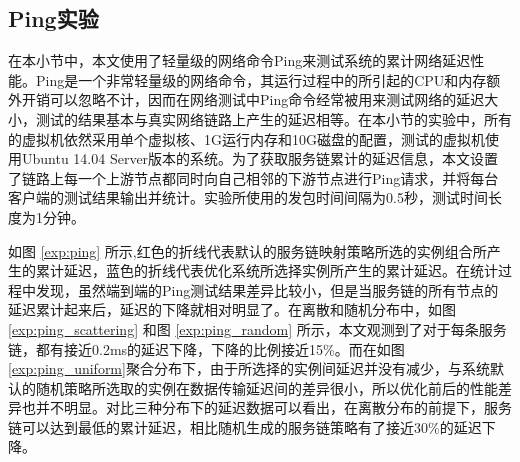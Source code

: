 \subsection{Ping实验}
在本小节中，本文使用了轻量级的网络命令Ping来测试系统的累计网络延迟性能。Ping是一个非常轻量级的网络命令，其运行过程中的所引起的CPU和内存额外开销可以忽略不计，因而在网络测试中Ping命令经常被用来测试网络的延迟大小，测试的结果基本与真实网络链路上产生的延迟相等。在本小节的实验中，所有的虚拟机依然采用单个虚拟核、1G运行内存和10G磁盘的配置，测试的虚拟机使用Ubuntu 14.04 Server版本的系统。为了获取服务链累计的延迟信息，本文设置了链路上每一个上游节点都同时向自己相邻的下游节点进行Ping请求，并将每台客户端的测试结果输出并统计。实验所使用的发包时间间隔为0.5秒，测试时间长度为1分钟。
\begin{figure}[!htp]
	\centering
	
\end{figure}
\begin{figure}
	\addtocounter{subfigure}{2}
	\ContinuedFloat
	\centering

\end{figure}
\newpage
如图 \ref{exp:ping} 所示,红色的折线代表默认的服务链映射策略所选的实例组合所产生的累计延迟，蓝色的折线代表优化系统所选择实例所产生的累计延迟。在统计过程中发现，虽然端到端的Ping测试结果差异比较小，但是当服务链的所有节点的延迟累计起来后，延迟的下降就相对明显了。在离散和随机分布中，如图 \ref{exp:ping_scattering} 和图 \ref{exp:ping_random} 所示，本文观测到了对于每条服务链，都有接近0.2ms的延迟下降，下降的比例接近15\%。而在如图\ref{exp:ping_uniform}聚合分布下，由于所选择的实例间延迟并没有减少，与系统默认的随机策略所选取的实例在数据传输延迟间的差异很小，所以优化前后的性能差异也并不明显。对比三种分布下的延迟数据可以看出，在离散分布的前提下，服务链可以达到最低的累计延迟，相比随机生成的服务链策略有了接近30\%的延迟下降。

